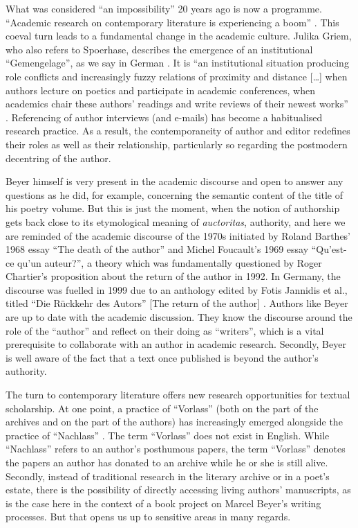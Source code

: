\begin{paper}
What was considered ``an impossibility'' 20 years ago \citep{steinfeld_literaturwissenschaft_1997,spoerhase_literaturwissenschaft_2014} is now a programme. ``Academic research on contemporary
literature is experiencing a boom'' \parencite{noauthor_dfg-graduiertenkolleg_nodate}. This coeval turn leads to a fundamental change in
the academic culture. Julika Griem, who also refers to Spoerhase,
describes the emergence of an institutional ``Gemengelage'', as we say in German \citep[101]{griem_standards_2015}. It is ``an institutional situation producing role
conflicts and increasingly fuzzy relations of proximity and distance
{[}\ldots{]} when authors lecture on poetics and participate in academic
conferences, when academics chair these authors' readings and write
reviews of their newest works'' \parencite{noauthor_info_nodate}.
Referencing of author interviews (and e-mails) has become a habitualised
research practice. As a result, the contemporaneity of author and editor
redefines their roles as well as their relationship, particularly so
regarding the postmodern decentring of the author.

Beyer himself is very present in the academic discourse and open to
answer any questions as he did, for example, concerning the semantic
content of the title of his poetry volume. But this is just the moment,
when the notion of authorship gets back close to its etymological
meaning of \emph{auctoritas}, authority, and here we are reminded of the
academic discourse of the 1970s initiated by Roland Barthes' 1968 essay
``The death of the author'' and Michel Foucault's 1969 essay ``Qu'est-ce
qu'un auteur?'', a theory which was fundamentally questioned by Roger
Chartier's proposition about the return of the author in 1992. In
Germany, the discourse was fuelled in 1999 due to an anthology edited by
Fotis Jannidis et al., titled ``Die Rückkehr des Autors'' [The return of
the author] \citep{jannidis_ruckkehr_1999}. Authors like Beyer are up to date with the
academic discussion. They know the discourse around the role of the
``author'' and reflect on their doing as ``writers'', which is a vital
prerequisite to collaborate with an author in academic research.
Secondly, Beyer is well aware of the fact that a text once published is
beyond the author's authority.

The turn to contemporary literature offers new research opportunities
for textual scholarship. At one point, a practice of ``Vorlass'' (both on the part of the archives
and on the part of the authors) has increasingly emerged alongside the practice of ``Nachlass'' \citep{sina_nachlassbewusstsein_2017}. The term ``Vorlass'' does not exist in English. While
``Nachlass'' refers to an author's posthumous papers, the term
``Vorlass'' denotes the papers an author has donated to an archive while
he or she is still alive. Secondly, instead of traditional research in
the literary archive or in a poet's estate, there is the possibility of
directly accessing  living authors' manuscripts, as is the
case here in the context of a book project on Marcel Beyer's writing
processes. But that opens us up to sensitive areas in many regards.


\end{paper}
